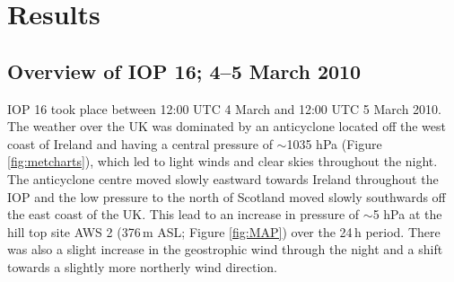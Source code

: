 \documentclass[times]{qjrms4}
\begin{document}
\section{Results}
\subsection{Overview of IOP 16; 4--5 March 2010}
IOP 16 took place between 12:00 UTC 4 March and 12:00 UTC 5 March 2010. The weather over the UK was dominated by an anticyclone located off the west coast of Ireland and having a central pressure of $\sim$1035 hPa (Figure \ref{fig:metcharts}), which led to light winds and clear skies throughout the night. The anticyclone centre moved slowly eastward towards Ireland throughout the IOP and the low pressure to the north of Scotland moved slowly southwards off the east coast of the UK. This lead to an increase in pressure of $\sim$5 hPa at the hill top site AWS 2 (376$\,\mbox{m}$ ASL; Figure \ref{fig:MAP}) over the 24$\,\mbox{h}$ period. There was also a slight increase in the geostrophic wind through the night and a shift towards a slightly more northerly wind direction.
\end{document}
